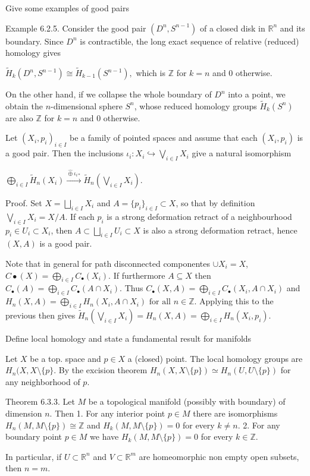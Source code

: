 Give some examples of good pairs

Example 6.2.5. 
Consider the good pair \((D^n, S^{n-1})\) of a closed disk in \(\mathbb{R}^n\) and its boundary. 
Since \(D^n\) is contractible, the long exact sequence of relative (reduced) homology gives 

\(\tilde{H}_k(D^n, S^{n-1}) \cong \tilde{H}_{k-1}(S^{n-1}),\)
which is \(\mathbb{Z}\) for \(k = n\) and 0 otherwise.

On the other hand, if we collapse the whole boundary of \(D^n\) into a point, we obtain the \(n\)-dimensional sphere \(S^n\), 
whose reduced homology groups \(\tilde{H}_k(S^n)\) are also \(\mathbb{Z}\) for \(k = n\) and 0 otherwise.

Let \((X_i, p_i)_{i \in I}\) be a family of pointed spaces and assume that each \((X_i, p_i)\) is a good pair. Then the 
inclusions \(\iota_i: X_i \hookrightarrow \bigvee_{i \in I} X_i\) give a natural isomorphism

\(\bigoplus_{i \in I} \tilde{H}_n(X_i) \xrightarrow{\hat{\oplus} \iota_{i*}} \tilde{H}_n \left( \bigvee_{i \in I} X_i \right).\)

Proof. 
Set \(X = \bigsqcup_{i \in I} X_i\) and \(A = \{p_i\}_{i \in I} \subset X\), so that by definition \(\bigvee_{i \in I} X_i = X/A\).
If each \(p_i\) is a strong deformation retract of a neighbourhood \(p_i \in U_i \subset X_i\), 
then \(A \subset \bigsqcup_{i \in I} U_i \subset X\) is also a strong deformation retract, hence \((X, A)\) is a good pair.

Note that in general for path disconnected componentes \( \cup X_i = X \), \( C\bullet(X) = \bigoplus_{i \in I} C_\bullet(X_i) \). 
If furthermore \( A \subseteq X \) then \( C_\bullet(A) = \bigoplus_{i \in I} C_\bullet(A \cap X_i) \). 
Thus \( C_\bullet(X, A) = \bigoplus_{i \in I} C_\bullet(X_i, A \cap X_i) \) and 
\( H_n(X, A) = \bigoplus_{i \in I} H_n(X_i, A \cap X_i) \text{ for all } n \in \mathbb{Z} \).
Applying this to the previous then gives \( \tilde{H}_n(\bigvee_{i \in I} X_i) = H_n(X, A) = \bigoplus_{i \in I} H_n(X_i, p_i) \).



Define local homology and state a fundamental result for manifolds

Let \( X \) be a top. space and \( p \in X \) a (closed) point. The local homology groups are \( H_n(X, X \setminus \{p\}\).
By the excision theorem \( H_n(X, X\setminus \{p\}) \simeq H_n(U, U \setminus \{p\}) \) for any neighborhood of \( p \).

Theorem 6.3.3. 
Let \(M\) be a topological manifold (possibly with boundary) of dimension \(n\). Then 
1. For any interior point \(p \in M\) there are isomorphisms \(H_n(M, M \setminus \{p\}) \cong \mathbb{Z}\) and \(H_k(M, M \setminus \{p\}) = 0\) for every \(k \neq n\).
2. For any boundary point \(p \in M\) we have \(H_k(M, M \setminus \{p\}) = 0\) for every \(k \in \mathbb{Z}\).

In particular, if \(U \subset \mathbb{R}^n\) and \(V \subset \mathbb{R}^m\) are homeomorphic non empty open subsets, then \(n = m\).
